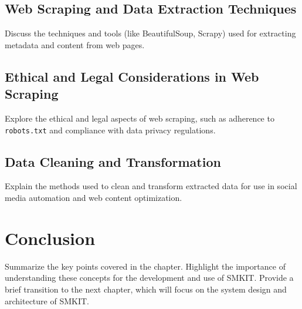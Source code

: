 \subsection{Web Scraping and Data Extraction Techniques}
Discuss the techniques and tools (like BeautifulSoup, Scrapy) used for extracting metadata and content from web pages.

\subsection{Ethical and Legal Considerations in Web Scraping}
Explore the ethical and legal aspects of web scraping, such as adherence to \texttt{robots.txt} and compliance with data privacy regulations.

\subsection{Data Cleaning and Transformation}
Explain the methods used to clean and transform extracted data for use in social media automation and web content optimization.

\section{Conclusion}
\label{sec:preliminaries-conclusion}
Summarize the key points covered in the chapter. Highlight the importance of understanding these concepts for the development and use of SMKIT. Provide a brief transition to the next chapter, which will focus on the system design and architecture of SMKIT.
